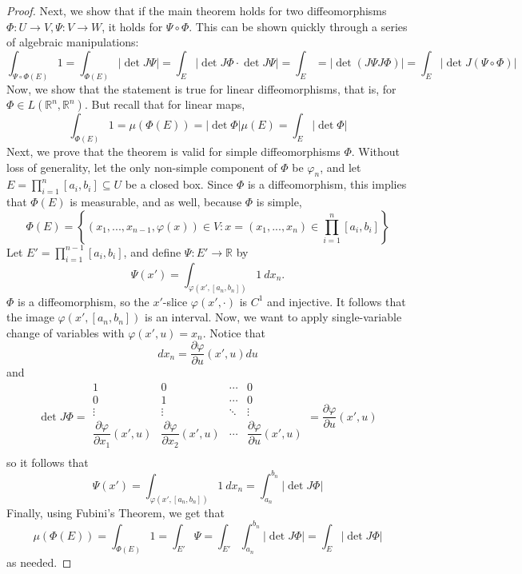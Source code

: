 \documentclass{article}
\theoremstyle{plain} %
\numberwithin{thm}{section} %
\theoremstyle{definition}
\begin{document}
\begin{proof}
        Next, we show that if the main theorem holds for two diffeomorphisms \(\Phi : U \to V,\Psi : V \to W\), it holds for \(\Psi \circ \Phi\). This can be shown quickly through a series of algebraic manipulations:
        \[
            \int _{\Psi \circ \Phi (E)} 1 = \int _{\Phi (E)} |\det J \Psi | = \int _E |\det J \Phi \cdot \det J \Psi | = \int _E = |\det (J \Psi J \Phi)| = \int _E |\det J (\Psi \circ \Phi)|
        \]
        Now, we show that the statement is true for linear diffeomorphisms, that is, for \(\Phi \in L(\mathbb{R}^n, \mathbb{R}^n)\). But recall that for linear maps,
        \[
            \int _{\Phi (E)} 1 = \mu (\Phi (E)) = |\det \Phi | \mu (E) = \int _E |\det \Phi |
        \]
        Next, we prove that the theorem is valid for simple diffeomorphisms \(\Phi\). Without loss of generality, let the only non-simple component of \(\Phi\) be \(\varphi _n\), and let \(E = \prod_{i=1}^n [a_i, b_i] \subseteq U\) be a closed box. Since \(\Phi\) is a diffeomorphism, this implies that \(\Phi (E)\) is measurable, and as well, because \(\Phi\) is simple,
        \[
            \Phi (E) = \left\{ (x_1, ..., x_{n-1}, \varphi (x)) \in V : x = (x_1, ..., x_n) \in \prod_{i=1}^{n} [a_i, b_i] \right\} 
        \]
        Let \(E' = \prod_{i=1}^{n-1} [a_i, b_i]\), and define \(\Psi : E' \to \mathbb{R}\) by
        \[
            \Psi (x') = \int_{\varphi (x', [a_n, b_n])} 1\ dx_n.
        \]
        \(\Phi\) is a diffeomorphism, so the \(x'\)-slice \(\varphi(x', \cdot)\) is \(C^1\) and injective. It follows that the image \(\varphi(x', [a_n, b_n])\) is an interval. Now, we want to apply single-variable change of variables with \(\varphi (x', u) = x_n\). Notice that
        \[
            dx_n = \frac{\partial \varphi }{\partial u}(x', u) du
        \]
        and
        \[
            \det J \Phi = \begin{array}{|cccc|}
                1 & 0 & \cdots &  0 \\
                0 & 1 & \cdots &  0 \\
                \vdots & \vdots & \ddots &  \vdots \\
                \dfrac{\partial \varphi }{\partial x_1}(x', u) & \dfrac{\partial \varphi }{\partial x_2}(x', u) & \cdots & \dfrac{\partial \varphi }{\partial u}(x', u) \\
            \end{array} = \frac{\partial \varphi }{\partial u}(x', u)
        \]
        so it follows that
        \[
            \Psi (x') = \int_{\varphi (x', [a_n, b_n])} 1\ dx_n = \int _{a_n}^{b_n} |\det J \Phi |
        \]
        Finally, using Fubini's Theorem, we get that
        \[
            \mu (\Phi (E)) = \int _{\Phi (E)} 1 = \int _{E'} \Psi = \int _{E'} \int_{a_n}^{b_n} |\det J \Phi | = \int _E |\det J \Phi |
        \]
        as needed.


\end{proof}
\end{document}
